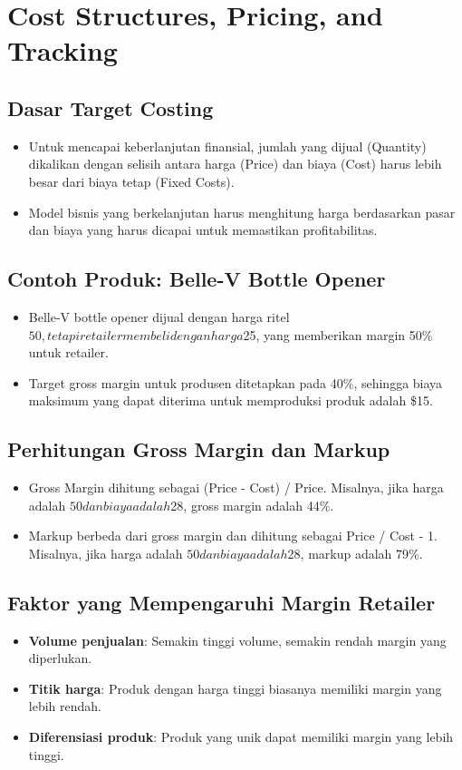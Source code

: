 \documentclass{article}
\begin{document}
\section{Cost Structures, Pricing, and Tracking}
\subsection{Dasar Target Costing}
\begin{itemize}
    \item Untuk mencapai keberlanjutan finansial, jumlah yang dijual (Quantity) dikalikan dengan selisih antara harga (Price) dan biaya (Cost) harus lebih besar dari biaya tetap (Fixed Costs).
    \item Model bisnis yang berkelanjutan harus menghitung harga berdasarkan pasar dan biaya yang harus dicapai untuk memastikan profitabilitas.
\end{itemize}

\subsection{Contoh Produk: Belle-V Bottle Opener}
\begin{itemize}
    \item Belle-V bottle opener dijual dengan harga ritel $50, tetapi retailer membeli dengan harga $25, yang memberikan margin 50\% untuk retailer.
    \item Target gross margin untuk produsen ditetapkan pada 40\%, sehingga biaya maksimum yang dapat diterima untuk memproduksi produk adalah \$15.
\end{itemize}

\subsection{Perhitungan Gross Margin dan Markup}
\begin{itemize}
    \item Gross Margin dihitung sebagai (Price - Cost) / Price. Misalnya, jika harga adalah $50 dan biaya adalah $28, gross margin adalah 44\%.
    \item Markup berbeda dari gross margin dan dihitung sebagai Price / Cost - 1. Misalnya, jika harga adalah $50 dan biaya adalah $28, markup adalah 79\%.
\end{itemize}

\subsection{Faktor yang Mempengaruhi Margin Retailer}
\begin{itemize}
    \item \textbf{Volume penjualan}: Semakin tinggi volume, semakin rendah margin yang diperlukan.
    \item \textbf{Titik harga}: Produk dengan harga tinggi biasanya memiliki margin yang lebih rendah.
    \item \textbf{Diferensiasi produk}: Produk yang unik dapat memiliki margin yang lebih tinggi.
\end{itemize}
\end{document}
